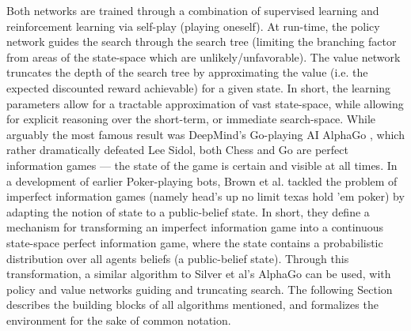 \newline \newline 
Both networks are trained through a combination of supervised learning and reinforcement learning via self-play (playing oneself). At run-time, the policy network guides the search through the search tree (limiting the branching factor from areas of the state-space which are unlikely/unfavorable). The value network truncates the depth of the search tree by approximating the value (i.e. the expected discounted reward achievable) for a given state. In short, the learning parameters allow for a tractable approximation of vast state-space, while allowing for explicit reasoning over the short-term, or immediate search-space. 
\newline \newline
While arguably the most famous result was DeepMind's Go-playing AI AlphaGo \cite{AlphaGo}, which rather dramatically defeated Lee Sidol, both Chess and Go are perfect information games --- the state of the game is certain and visible at all times. In a development of earlier Poker-playing bots, Brown et al. \cite{Brown2020} tackled the problem of imperfect information games (namely head's up no limit texas hold 'em poker) by adapting the notion of state to a public-belief state. In short, they define a mechanism for transforming an imperfect information game into a continuous state-space perfect information game, where the state contains a probabilistic distribution over all agents beliefs (a public-belief state). Through this transformation, a similar algorithm to Silver et al's AlphaGo can be used, with policy and value networks guiding and truncating search.
\newline \newline
The following Section describes the building blocks of all algorithms mentioned, and formalizes the environment for the sake of common notation.   


